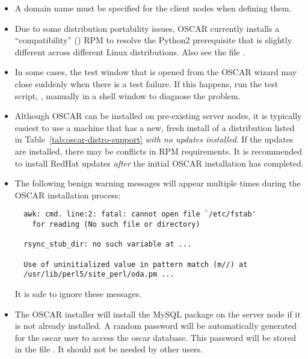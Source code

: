 \begin{itemize}
\item A domain name must be specified for the client nodes when
  defining them.

\item Due to some distribution portability issues, OSCAR currently installs
  a ``compatibility''  () RPM to resolve the
  Python2 prerequisite that is slightly different across different Linux
  distributions.  Also see the file .

\item In some cases, the test window that is opened from the
  OSCAR wizard may close suddenly when there is a test failure. If
  this happens, run the test script, ,
  manually in a shell window to diagnose the problem.

\item Although OSCAR can be installed on pre-existing server nodes, it
  is typically easiest to use a machine that has a new, fresh install
  of a distribution listed in Table~\ref{tab:oscar-distro-support}
  {\em with no updates installed}.  If the updates are installed,
  there may be conflicts in RPM requirements.  It is recommended to
  install RedHat updates {\em after} the initial OSCAR installation has
  completed.

\item The following benign warning messages will appear multiple times
  during the OSCAR installation process:

\begin{verbatim}
  awk: cmd. line:2: fatal: cannot open file `/etc/fstab'
    for reading (No such file or directory)

  rsync_stub_dir: no such variable at ...

  Use of uninitialized value in pattern match (m//) at
  /usr/lib/perl5/site_perl/oda.pm ...
\end{verbatim}

  It is safe to ignore these messages.

\item The OSCAR installer will install the MySQL package on the server
  node if it is not already installed.  A random password will be automatically
\begchange
  generated for the oscar user to access the oscar database.  This
  password will be stored in the file .  It should
  not be needed by other users.
\endchange


\end{itemize}
